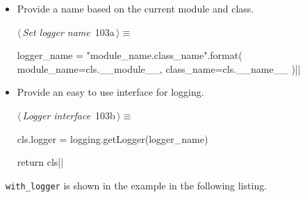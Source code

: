 \documentclass[%
    a4paper,    %
    justified,  %
    nobib,      %
    openany     %
]{tufte-book}
\makeatletter
\renewcommand{\label}[1]{\@tufte@label{##1}}%
\makeatother
\begin{document}
\begin{itemize}
  \item Provide a name based on the current module and class.
    \begin{flushleft} \small
\begin{minipage}{\linewidth}\label{scrap57}\raggedright\small
{} $\langle\,${\itshape Set logger name}\nobreak\ {\footnotesize {103a}}$\,\rangle\equiv$
\vspace{-1ex}
\begin{pythoncode}
logger_name = "{module_name}.{class_name}".format(
    module_name=cls.__module__,
    class_name=cls.__name__
)|\NWsep|
\end{pythoncode}
\vspace{1.5ex}
\footnotesize
{}
\end{minipage}\vspace{4ex}
\end{flushleft}
\item Provide an easy to use interface for logging.
    \begin{flushleft} \small
\begin{minipage}{\linewidth}\label{scrap58}\raggedright\small
{} $\langle\,${\itshape Logger interface}\nobreak\ {\footnotesize {103b}}$\,\rangle\equiv$
\vspace{-1ex}
\begin{pythoncode}
cls.logger = logging.getLogger(logger_name)

return cls|\NWsep|
\end{pythoncode}
\vspace{1.5ex}
\footnotesize
{}
\end{minipage}\vspace{4ex}
\end{flushleft}
\end{itemize}

~\verb=with_logger= is shown in the
example in the following listing.
\end{document}
